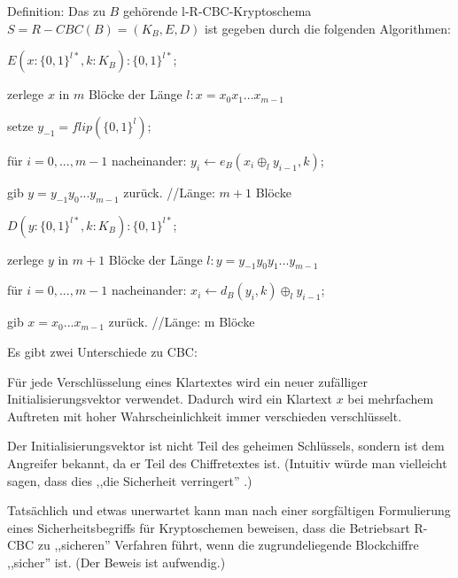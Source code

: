 \documentclass[a4paper]{article}
\begin{document}
\begin{multicols}{3}
    Definition: Das zu $B$ gehörende l-R-CBC-Kryptoschema $S=R-CBC(B) = (K_B,E,D)$ ist gegeben durch die folgenden Algorithmen:
    \begin{itemize*}
        \item $E(x:\{0,1\}^{l*},k:K_B) :\{0,1\}^{l*}$;
        \item zerlege $x$ in $m$ Blöcke der Länge $l:x=x_0 x_1 ...x_{m-1}$
        \item setze $y_{-1}= flip(\{0,1\}^l)$;
        \item für $i=0,...,m-1$ nacheinander: $y_i\leftarrow e_B(x_i\oplus_l y_{i-1} ,k)$;
        \item gib $y=y_{-1} y_0 ...y_{m-1}$ zurück. //Länge: $m+1$ Blöcke
        \item $D(y:\{0,1\}^{l*},k:K_B) :\{0,1\}^{l*}$;
        \item zerlege $y$ in $m+1$ Blöcke der Länge $l:y=y_{-1} y_0 y_1 ...y_{m-1}$
        \item für $i=0,...,m-1$ nacheinander: $x_i\leftarrow d_B(y_i,k)\oplus_l y_{i-1}$;
        \item gib $x=x_0 ...x_{m-1}$ zurück. //Länge: m Blöcke
    \end{itemize*}

    Es gibt zwei Unterschiede zu CBC:
    \begin{enumerate*}
        \item Für jede Verschlüsselung eines Klartextes wird ein neuer zufälliger Initialisierungsvektor verwendet. Dadurch wird ein Klartext $x$ bei mehrfachem Auftreten mit hoher Wahrscheinlichkeit immer verschieden verschlüsselt.
        \item  Der Initialisierungsvektor ist nicht Teil des geheimen Schlüssels, sondern ist dem Angreifer bekannt, da er Teil des Chiffretextes ist. (Intuitiv würde man vielleicht sagen, dass dies ,,die Sicherheit verringert'' .)
    \end{enumerate*}

    Tatsächlich und etwas unerwartet kann man nach einer sorgfältigen Formulierung eines Sicherheitsbegriffs für Kryptoschemen beweisen, dass die Betriebsart R-CBC zu ,,sicheren'' Verfahren führt, wenn die zugrundeliegende Blockchiffre ,,sicher'' ist. (Der Beweis ist
    aufwendig.)


\end{multicols}
\end{document}
